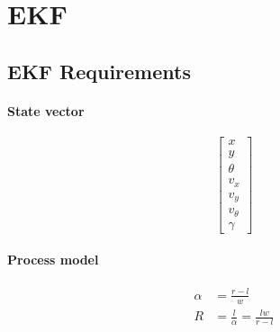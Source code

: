\documentclass[oneside, 12pt, a4paper]{book}
\begin{document}
\chapter{EKF}

\section{EKF Requirements}
\subsubsection{State vector}
\begin{equation} 
    \begin{bmatrix}
        x \\ y \\ \theta \\
        v_x \\ v_y \\ v_\theta \\
        \gamma
    \end{bmatrix}
\end{equation}
\subsubsection{Process model}

\begin{equation}
    \begin{split}
        \alpha &= \frac{r-l}{w} \\
        R &= \frac{l}{\alpha} = \frac{lw}{r-l}\\
    \end{split}
\end{equation}

\end{document}

